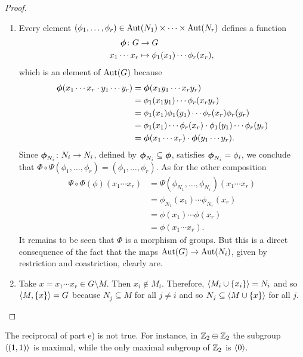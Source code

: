 \begin{proof}
\begin{enumerate}[\rm a)]
    \item Every element $(\phi_1,\dots,\phi_r)\in{\rm Aut}(N_1)\times\cdots\times{\rm Aut}(N_r)$ defines a function
    \begin{align*}
        \textrm{\boldmath$\phi$}\colon G&\to G\\
        x_1\cdots x_r&\mapsto\phi_1(x_1)\cdots\phi_r(x_r),
    \end{align*}
    which is an element of ${\rm Aut}(G)$ because
    \begin{align*}
        \textrm{\boldmath$\phi$}(x_1\cdots x_r\cdot y_1\cdots y_r)
            &= \textrm{\boldmath$\phi$}(x_1y_1\cdots x_ry_r)\\
            &= \phi_1(x_1y_1)\cdots\phi_r(x_ry_r)\\
            &= \phi_1(x_1)\phi_1(y_1)\cdots\phi_r(x_r)\phi_r(y_r)\\
            &= \phi_1(x_1)\cdots\phi_r(x_r)\cdot\phi_1(y_1)\cdots\phi_r(y_r)\\
            &= \textrm{\boldmath$\phi$}(x_1\cdots x_r)\cdot\textrm{\boldmath$\phi$}(y_1\cdots y_r).
    \end{align*}
    Since $\textrm{\boldmath$\phi$}_{N_i}\colon N_i\to N_i$, defined by $\textrm{\boldmath$\phi$}_{N_i}\subseteq\textrm{\boldmath$\phi$}$, satisfies $\textrm{\boldmath$\phi$}_{N_i}=\phi_i$, we conclude that $\Phi\circ\Psi(\phi_1,\dots,\phi_r)=(\phi_1,\dots,\phi_r)$. As for the other composition
    \begin{align*}
        \Psi\circ\Phi(\phi)(x_1\cdots x_r) &= \Psi(\phi_{N_1},\dots,\phi_{N_r})(x_1\cdots x_r)\\
            &= \phi_{N_1}(x_1)\cdots\phi_{N_r}(x_r)\\
            &= \phi(x_1)\cdots\phi(x_r)\\
            &= \phi(x_1\cdots x_r).
    \end{align*}
    It remains to be seen that $\Phi$ is a morphism of groups. But this is a direct consequence of the fact that the maps ${\rm Aut}(G)\to{\rm Aut}(N_i)$, given by restriction and coastriction, clearly are.

    \item Take $x=x_1\cdots x_r\in G\setminus M$. Then $x_i\notin M_i$. Therefore, $\langle M_i\cup\{x_i\}\rangle=N_i$ and so $\langle M,\{x\}\rangle=G$ because $N_j\subseteq M$ for all $j\ne i$ and so $N_j\subseteq\langle M\cup\{x\}\rangle$ for all $j$.
\end{enumerate}
\end{proof}

\begin{rem}
    The reciprocal of part e) is not true. For instance, in $\mathbb{Z}_2\oplus\mathbb{Z}_2$ the subgroup $\langle(1,1)\rangle$ is maximal, while the only maximal subgroup of $\mathbb{Z}_2$ is $\langle0\rangle$.
\end{rem}

